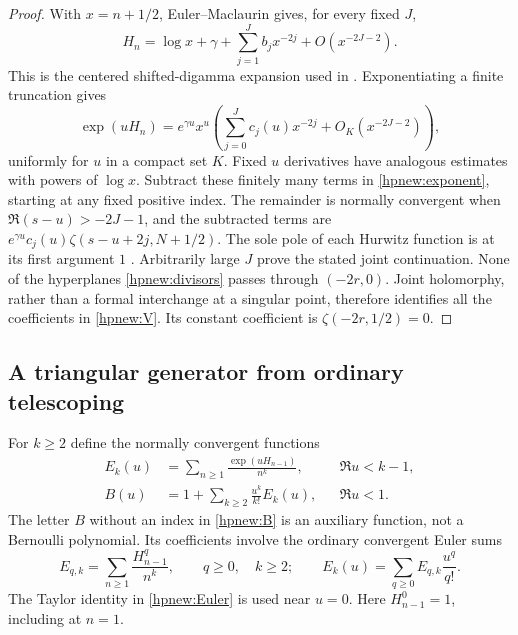 \begin{proof}
With $x=n+1/2$, Euler--Maclaurin gives, for every fixed $J$,
\[
 H_n=\log x+\gamma+\sum_{j=1}^Jb_jx^{-2j}
                              +O(x^{-2J-2}).
\]
This is the centered shifted-digamma expansion used in
\cite{RepoExactResonant}. Exponentiating a finite truncation gives
\begin{equation}\label{hpnew:asymptotic}
 \exp(uH_n)=e^{\gamma u}x^u
      \left(\sum_{j=0}^Jc_j(u)x^{-2j}
                         +O_K(x^{-2J-2})\right),
\end{equation}
uniformly for $u$ in a compact set $K$. Fixed $u$ derivatives have
analogous estimates with powers of $\log x$.
Subtract these finitely many terms in \eqref{hpnew:exponent}, starting
at any fixed positive index. The remainder is normally convergent
when $\Re(s-u)>-2J-1$, and the subtracted terms are
$e^{\gamma u}c_j(u)\zeta(s-u+2j,N+1/2)$.
The sole pole of each Hurwitz function is at its first argument $1$
\cite{DLMFHurwitz}. Arbitrarily large $J$ prove the stated joint
continuation. None of the hyperplanes \eqref{hpnew:divisors} passes
through $(-2r,0)$. Joint holomorphy, rather than a formal interchange
at a singular point, therefore identifies all the coefficients in
\eqref{hpnew:V}. Its constant coefficient is
$\zeta(-2r,1/2)=0$.
\end{proof}

\subsection{A triangular generator from ordinary telescoping}

For $k\ge2$ define the normally convergent functions
\begin{align}
 E_k(u)&=\sum_{n\ge1}\frac{\exp(uH_{n-1})}{n^k},
                                  &&\Re u<k-1,\label{hpnew:Ek}\\
 B(u)&=1+\sum_{k\ge2}\frac{u^k}{k!}E_k(u),
                                  &&\Re u<1.\label{hpnew:B}
\end{align}
The letter $B$ without an index in \eqref{hpnew:B} is an auxiliary
function, not a Bernoulli polynomial. Its coefficients involve the
ordinary convergent Euler sums
\begin{equation}\label{hpnew:Euler}
 E_{q,k}=\sum_{n\ge1}\frac{H_{n-1}^q}{n^k},\qquad
 q\ge0,\quad k\ge2;\qquad
 E_k(u)=\sum_{q\ge0}E_{q,k}\frac{u^q}{q!}.
\end{equation}
The Taylor identity in \eqref{hpnew:Euler} is used near $u=0$.
Here $H_{n-1}^0=1$, including at $n=1$.

